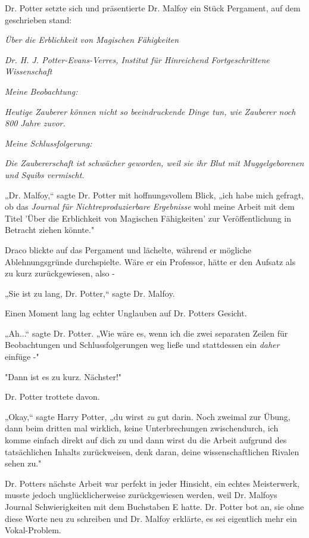 {Dr. Potter setzte sich und präsentierte Dr. Malfoy ein Stück Pergament, auf dem geschrieben stand:

\emph{Über die Erblichkeit von Magischen Fähigkeiten}

\hfill\break

\emph{Dr. H. J. Potter-Evans-Verres, Institut für Hinreichend Fortgeschrittene Wissenschaft}

\hfill\break

\emph{Meine Beobachtung:}

\hfill\break

\emph{Heutige Zauberer können nicht so beeindruckende Dinge tun, wie Zauberer noch 800 Jahre zuvor.}

\hfill\break

\emph{Meine Schlussfolgerung:}

\hfill\break

\emph{Die Zaubererschaft ist schwächer geworden, weil sie ihr Blut mit Muggelgeborenen und Squibs vermischt.}

\hfill\break „Dr. Malfoy,“ sagte Dr. Potter mit hoffnungsvollem Blick, „ich habe mich gefragt, ob das \emph{Journal für Nichtreproduzierbare Ergebnisse} wohl meine Arbeit mit dem Titel 'Über die Erblichkeit von Magischen Fähigkeiten' zur Veröffentlichung in Betracht ziehen könnte."

Draco blickte auf das Pergament und lächelte, während er mögliche Ablehnungsgründe durchspielte. Wäre er ein Professor, hätte er den Aufsatz als zu kurz zurückgewiesen, also -

„Sie ist zu lang, Dr. Potter,“ sagte Dr. Malfoy.

Einen Moment lang lag echter Unglauben auf Dr. Potters Gesicht.

„Ah...“ sagte Dr. Potter. „Wie wäre es, wenn ich die zwei separaten Zeilen für Beobachtungen und Schlussfolgerungen weg ließe und stattdessen ein \emph{daher} einfüge -"

"Dann ist es zu kurz. Nächster!"

Dr. Potter trottete davon.

„Okay,“ sagte Harry Potter, „du wirst \emph{zu} gut darin. Noch zweimal zur Übung, dann beim dritten mal wirklich, keine Unterbrechungen zwischendurch, ich komme einfach direkt auf dich zu und dann wirst du die Arbeit aufgrund des tatsächlichen Inhalts zurückweisen, denk daran, deine wissenschaftlichen Rivalen sehen zu."

Dr. Potters nächste Arbeit war perfekt in jeder Hinsicht, ein echtes Meisterwerk, musste jedoch unglücklicherweise zurückgewiesen werden, weil Dr. Malfoys Journal Schwierigkeiten mit dem Buchstaben E hatte. Dr. Potter bot an, sie ohne diese Worte neu zu schreiben und Dr. Malfoy erklärte, es sei eigentlich mehr ein Vokal-Problem.

}
